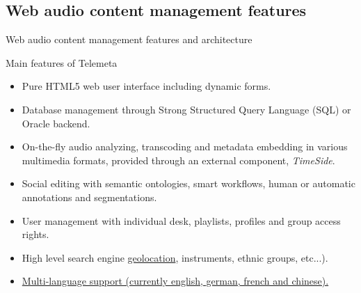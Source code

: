 \documentclass[final, hyperref, table]{beamer}
\begin{document}
\subsection{Web audio content management features}
\begin{frame}[label=telemeta_features]{Web audio content management features and architecture}
  \begin{block}{Main features of Telemeta}\footnotesize
    \begin{itemize}
      \item \alert{Pure HTML5} web user interface including dynamic forms.
      \item Database management through Strong Structured Query Language (\alert{SQL}) or Oracle backend.
      \item \alert{On-the-fly audio analyzing}, transcoding and metadata
        embedding in various multimedia formats, provided through an external component, \emph{TimeSide}.
      \item Social editing with semantic ontologies, smart workflows, human or automatic annotations and segmentations.
      \item \alert{User management} with individual desk, playlists, profiles
        and group access rights.
      \item High level \alert{search engine} \hyperlink{geonavigator}{geolocation}, instruments, ethnic groups, etc...).
      \item \hyperlink{telemeta_languages}{Multi-language support (currently english, german, french and chinese).}
      \end{itemize}
  \end{block}
\end{frame}
\end{document}
